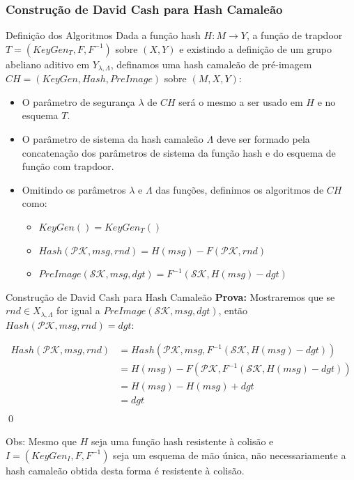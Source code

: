 \documentclass{beamer}
\begin{document}
\begin{frame}
\frametitle{Construção de David Cash para Hash Camaleão}

\begin{block}{Definição dos Algoritmos}
Dada a função hash $H: M \rightarrow Y$, a função de trapdoor $T=(KeyGen_T, F, F^{-1})$ sobre $(X, Y)$ e existindo a definição de um grupo abeliano aditivo em $Y_{\lambda,\Lambda}$, definamos uma hash camaleão de pré-imagem $CH=(KeyGen, Hash, PreImage)$ sobre $(M, X, Y)$:

\begin{itemize}
    \item O parâmetro de segurança $\lambda$ de $CH$ será o mesmo a ser usado em $H$ e no esquema $T$.
    \item O parâmetro de sistema da hash camaleão $\Lambda$ deve ser formado pela concatenação dos parâmetros de sistema da função hash e do esquema de função com trapdoor.
    \item Omitindo os parâmetros $\lambda$ e $\Lambda$ das funções, definimos os algoritmos de $CH$ como:
    \begin{itemize}
        \item $KeyGen() = KeyGen_T()$
        \item $Hash(\mathcal{PK}, msg, rnd) = H(msg) - F(\mathcal{PK}, rnd)$
        \item $PreImage(\mathcal{SK}, msg, dgt) = F^{-1}(\mathcal{SK}, H(msg) - dgt)$
    \end{itemize}
\end{itemize}

\end{block}

\end{frame}

\begin{frame}{Construção de David Cash para Hash Camaleão}
   \textbf{Prova:}  Mostraremos que se  $rnd \in X_{\lambda,\Lambda}$ for igual a $PreImage(\mathcal{SK}, msg, dgt)$, então $Hash(\mathcal{PK}, msg, rnd) = dgt$:
   
   \begin{equation}
 \begin{split}
 Hash(\mathcal{PK}, msg, rnd) &= Hash(\mathcal{PK}, msg, F^{-1}(\mathcal{SK}, H(msg) - dgt))\\
 &= H(msg) - F(\mathcal{PK}, F^{-1}(\mathcal{SK}, H(msg) - dgt))\\
&= H(msg) - H(msg) + dgt\\
&= dgt\\
 \end{split}
 \end{equation} \qed

Obs: Mesmo que $H$ seja uma função hash resistente à colisão e $I=(KeyGen_I, F, F^{-1})$ seja um esquema de mão única, não necessariamente a hash camaleão obtida desta forma é resistente à colisão.

\end{frame}
\end{document}
